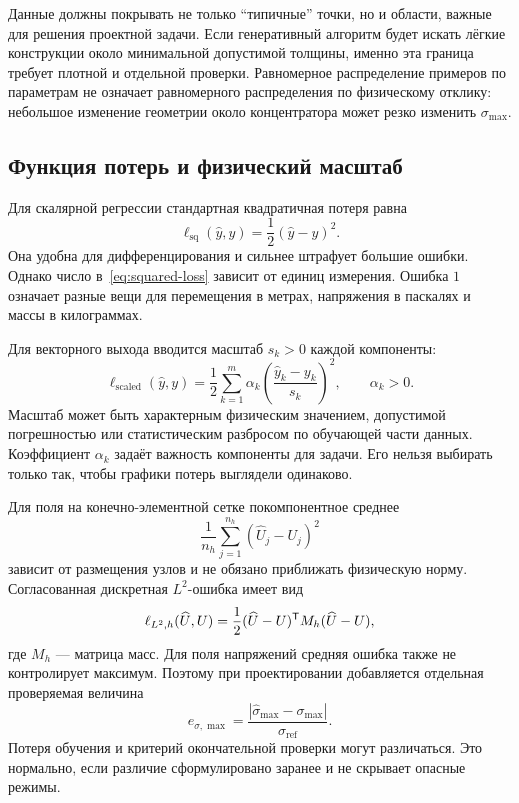 Данные должны покрывать не только ``типичные'' точки, но и области, важные для решения проектной задачи. Если генеративный алгоритм будет искать лёгкие конструкции около минимальной допустимой толщины, именно эта граница требует плотной и отдельной проверки. Равномерное распределение примеров по параметрам не означает равномерного распределения по физическому отклику: небольшое изменение геометрии около концентратора может резко изменить $\sigma_{\max}$.

\subsection{Функция потерь и физический масштаб}
Для скалярной регрессии стандартная квадратичная потеря равна
\begin{equation}
\label{eq:squared-loss}
 \ell_{\mathrm{sq}}(\widehat y,y)
 =
 \frac12(\widehat y-y)^2.
\end{equation}
Она удобна для дифференцирования и сильнее штрафует большие ошибки. Однако число в~\eqref{eq:squared-loss} зависит от единиц измерения. Ошибка $1$ означает разные вещи для перемещения в метрах, напряжения в паскалях и массы в килограммах.

Для векторного выхода вводится масштаб $s_k>0$ каждой компоненты:
\begin{equation}
 \ell_{\mathrm{scaled}}(\widehat y,y)
 =
 \frac12
 \sum_{k=1}^{m}
 \alpha_k
 \left(
 \frac{\widehat y_k-y_k}{s_k}
 \right)^2,
 \qquad
 \alpha_k>0.
\end{equation}
Масштаб может быть характерным физическим значением, допустимой погрешностью или статистическим разбросом по обучающей части данных. Коэффициент $\alpha_k$ задаёт важность компоненты для задачи. Его нельзя выбирать только так, чтобы графики потерь выглядели одинаково.

Для поля на конечно-элементной сетке покомпонентное среднее
\[
 \frac1{n_h}\sum_{j=1}^{n_h}
 (\widehat U_j-U_j)^2
\]
зависит от размещения узлов и не обязано приближать физическую норму. Согласованная дискретная $L^2$-ошибка имеет вид
\begin{equation}
 \ell_{L^2,h}(\widehat U,U)
 =
 \frac12
 (\widehat U-U)^{\mathsf{T}}
 M_h
 (\widehat U-U),
\end{equation}
где $M_h$ --- матрица масс. Для поля напряжений средняя ошибка также не контролирует максимум. Поэтому при проектировании добавляется отдельная проверяемая величина
\begin{equation}
 e_{\sigma,\max}
 =
 \frac{
 \left|\widehat\sigma_{\max}-\sigma_{\max}\right|
 }{
 \sigma_{\mathrm{ref}}
 }.
\end{equation}
Потеря обучения и критерий окончательной проверки могут различаться. Это нормально, если различие сформулировано заранее и не скрывает опасные режимы.

